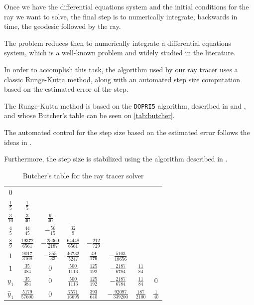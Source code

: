 Once we have the differential equations system and the initial conditions for the ray we want to solve, the final step is to numerically integrate, backwards in time, the geodesic followed by the ray.

The problem reduces then to numerically integrate a differential equations system, which is a well-known problem and widely studied in the literature.

In order to accomplish this task, the algorithm used by our ray tracer uses a classic Runge-Kutta method, along with an automated step size computation based on the estimated error of the step.

The Runge-Kutta method is based on the \texttt{DOPRI5} algorithm, described in \cite{hairer93} and \cite{hairer96}, and whose Butcher's table can be seen on \autoref{tab:butcher}.

The automated control for the step size based on the estimated error follows the ideas in \cite[Sec. II.4, Subsec. Automatic Step Size Control]{hairer93}.

Furthermore, the step size is stabilized using the algorithm described in \cite[Sec. IV.2]{hairer96}.

\begin{table}[bth]
	\myfloatalign
	\label{tab:butcher}
	\begin{tabularx}{.9\textwidth}{c|ccccccc}
		$0$&  & & & & & & \\
		$\frac{1}{5}$&  $\frac{1}{5}$& & & & & & \\
		$\frac{3}{10}$&  $\frac{3}{40}$&  $\frac{9}{40}$& & & & & \\
		$\frac{4}{5}$&  $\frac{44}{45}$&  $-\frac{56}{15}$&  $\frac{32}{9}$& & & & \\
		$\frac{8}{9}$&  $\frac{19372}{6561}$&  $-\frac{25360}{2187}$&  $\frac{64448}{6561}$&  $-\frac{212}{729}$& & & \\
		$1$&  $\frac{9017}{3168}$&  $-\frac{355}{33}$&  $\frac{46732}{5247}$&  $\frac{49}{176}$&  $-\frac{5103}{18656}$& & \\
		$1$&  $\frac{35}{384}$&  $0$&  $\frac{500}{1113}$&  $\frac{125}{192}$&  $-\frac{2187}{6784}$&  $\frac{11}{84}$& \\ \hline
		$y_1$&  $\frac{35}{384}$&  $0$&  $\frac{500}{1113}$&  $\frac{125}{192}$&  $-\frac{2187}{6784}$&  $\frac{11}{84}$&  $0$ \\ \hline
		$\widehat{y}_1$&  $\frac{5179}{57600}$&  $0$&  $\frac{7571}{16695}$&  $\frac{393}{640}$&  $-\frac{92097}{339200}$&  $\frac{187}{2100}$&  $\frac{1}{40}$
	\end{tabularx}
	\caption{Butcher's table for the ray tracer solver}
\end{table}

